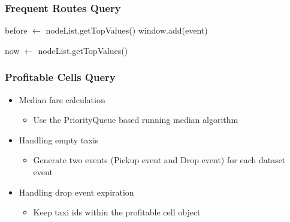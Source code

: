 \documentclass[]{beamer}
\begin{document}
\begin{frame}
\frametitle{Frequent Routes Query}

\begin{algorithm}[H]
\footnotesize
before $\gets$ nodeList.getTopValues()\;
window.add(event)\;


now $\gets$ nodeList.getTopValues()\;


\end{algorithm}


\end{frame}

\begin{frame}
\frametitle{Profitable Cells Query}
\begin{itemize}
        \item Median fare calculation
		\begin{itemize}
			\item Use the PriorityQueue based running median algorithm
		\end{itemize}
        \item Handling empty taxis
		\begin{itemize}
                        \item Generate two events (Pickup event and Drop event) for each dataset event
                \end{itemize}
        \item Handling drop event expiration
		\begin{itemize}
                        \item Keep taxi ids within the profitable cell object
                \end{itemize}
\end{itemize}

\end{frame}
\end{document}
